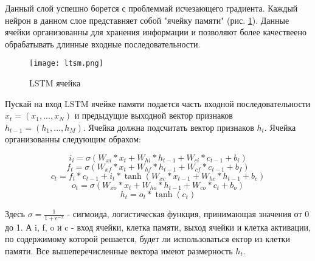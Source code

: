 Данный слой успешно борется с проблеммай исчезающего градиента. Каждый нейрон в данном слое представняет собой "ячейку памяти" (рис. \ref{ris:ltsm}). Данные ячейки организованны для хранения информации и позволяют более качествеено обрабатывать длинные входные последовательности.

\begin{figure}[h]
\begin{center}
	\texttt{[image: ltsm.png]}
	\caption{LSTM ячейка}
	\label{ris:ltsm}
\end{center}
\end{figure}


Пускай на вход LSTM ячейке памяти подается часть входной последовательности $x_t = (x_1, ..., x_N)$ и предыдущие выходной вектор признаков $h_{t-1} = (h_1, ..., h_M)$. Ячейка должна подсчитать вектор признаков $h_t$. Ячейка организованны следующим обрахом:


\begin{equation}
	i_i = \sigma(W_{xi}*x_t+W_{hi}*h_{t-1}+W_{ci}*c_{t-1}+b_i)
\end{equation}
\begin{equation}
	f_t = \sigma(W_{xf}*x_t+W_{hf}*h_{t-1}+W_{cf}*c_{t-1}+b_f)
\end{equation}
\begin{equation}
	c_t = f_t*c_{t-1}+i_t*\tanh(W_{xc}*x_{t-1}+W_{hc}*h_{t-1}+b_c)
\end{equation}
\begin{equation}
	o_t = \sigma(W_{xo}*x_t+W_{ho}*h_{t-1}+W_{co}*c_t+b_o)
\end{equation}
\begin{equation}
	h_t = o_t*\tanh(c_t)
\end{equation}

Здесь $\sigma = \frac{1}{1+e^{-x}} $ - сигмоида, логистическая функция, принимающая значения от 0 до 1. А i, f, o и c - вход ячейки, клетка памяти, выход ячейки и клетка активации, по содержимому которой решается, будет ли использоваться ектор из клетки памяти. Все вышеперечисленные вектора имеют размерность $h_t$.